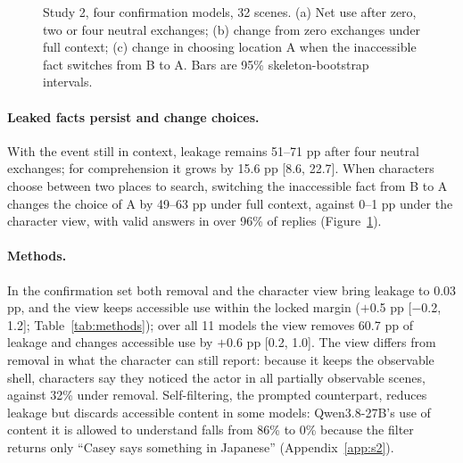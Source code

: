 \documentclass[11pt]{article}
\begin{document}
\begin{figure}[t]
\begin{lrbox}{\OCfigure}
\begin{tikzpicture}[x=1pt,y=-1pt]
\end{tikzpicture}
\end{lrbox}
\ifdim\wd\OCfigure>\linewidth\PackageError{access-paper}{Figure fig:behavior exceeds its column}{Revise the figure layout.}\fi
\usebox{\OCfigure}
\caption{Study 2, four confirmation models, 32 scenes. (a) Net use after zero, two or four neutral exchanges; (b) change from zero exchanges under full context; (c) change in choosing location A when the inaccessible fact switches from B to A. Bars are 95\% skeleton-bootstrap intervals.}
\label{fig:behavior}
\end{figure}

\paragraph{Leaked facts persist and change choices.} With the event still in context, leakage remains 51--71 pp after four neutral exchanges; for comprehension it grows by 15.6 pp [8.6, 22.7]. When characters choose between two places to search, switching the inaccessible fact from B to A changes the choice of A by 49--63 pp under full context, against 0--1 pp under the character view, with valid answers in over 96\% of replies (Figure~\ref{fig:behavior}).

\paragraph{Methods.} In the confirmation set both removal and the character view bring leakage to 0.03 pp, and the view keeps accessible use within the locked margin ($+$0.5 pp [$-$0.2, 1.2]; Table~\ref{tab:methods}); over all 11 models the view removes 60.7 pp of leakage and changes accessible use by $+$0.6 pp [0.2, 1.0]. The view differs from removal in what the character can still report: because it keeps the observable shell, characters say they noticed the actor in all partially observable scenes, against 32\% under removal. Self-filtering, the prompted counterpart, reduces leakage but discards accessible content in some models: Qwen3.8-27B's use of content it is allowed to understand falls from 86\% to 0\% because the filter returns only ``Casey says something in Japanese'' (Appendix~\ref{app:s2}).
\end{document}
